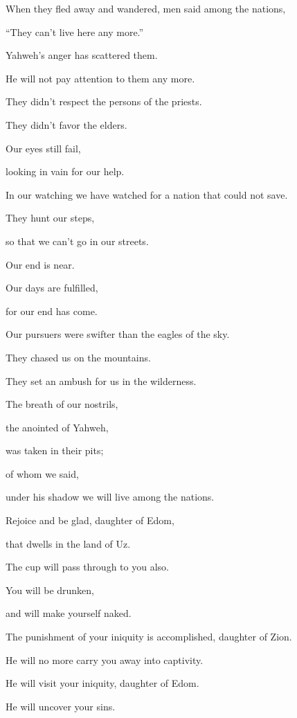 {\par }{\Q When they fled away and wandered, men said among the nations,
\par }{\QB “They can’t live here any more.”
\par }{\BB \par }{\Q {}Yahweh’s anger has scattered them.
\par }{\QB He will not pay attention to them any more.
\par }{\Q They didn’t respect the persons of the priests.
\par }{\QB They didn’t favor the elders.
\par }{\BB \par }{\Q {}Our eyes still fail,
\par }{\QB looking in vain for our help.
\par }{\QB In our watching we have watched for a nation that could not save.
\par }{\BB \par }{\Q {}They hunt our steps,
\par }{\QB so that we can’t go in our streets.
\par }{\Q Our end is near.
\par }{\QB Our days are fulfilled,
\par }{\QB for our end has come.
\par }{\BB \par }{\Q {}Our pursuers were swifter than the eagles of the sky.
\par }{\QB They chased us on the mountains.
\par }{\QB They set an ambush for us in the wilderness.
\par }{\BB \par }{\Q {}The breath of our nostrils,
\par }{\QB the anointed of Yahweh,
\par }{\QB was taken in their pits;
\par }{\Q of whom we said,
\par }{\QB under his shadow we will live among the nations.
\par }{\BB \par }{\Q {}Rejoice and be glad, daughter of Edom,
\par }{\QB that dwells in the land of Uz.
\par }{\Q The cup will pass through to you also.
\par }{\QB You will be drunken,
\par }{\QB and will make yourself naked.
\par }{\BB \par }{\Q {}The punishment of your iniquity is accomplished, daughter of Zion.
\par }{\QB He will no more carry you away into captivity.
\par }{\Q He will visit your iniquity, daughter of Edom.
\par }{\QB He will uncover your sins.

}

